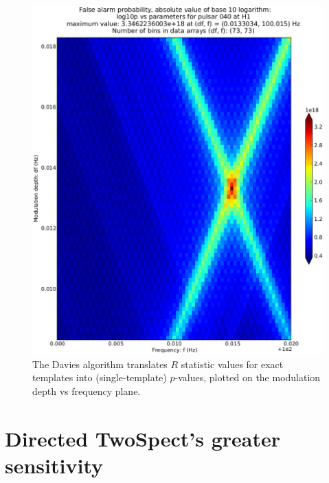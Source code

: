 \begin{figure}
\begin{center}
\includegraphics[width=0.8\paperwidth,height=0.62\paperheight]{Prob-4e21-on-4e24.eps}
\caption{The Davies algorithm translates $R$ statistic values for exact templates into (single-template) $p$-values, plotted on the modulation depth vs frequency plane.}
\end{center}
\end{figure}




\section{Directed TwoSpect's greater sensitivity}

